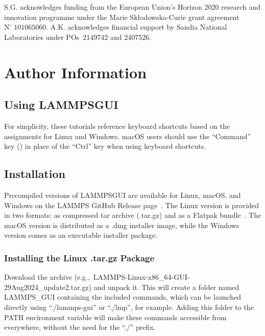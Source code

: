 \documentclass[9pt,tutorial]{livecoms}
\newcommand{\lammpsgui}{\textsf{LAMMPS\textendash GUI}}
\begin{document}
S.G. acknowledges funding from the European Union's Horizon 2020 research and
innovation programme under the Marie Skłodowska-Curie grant agreement $\text{N}^\circ\;101065060$.
A.K. acknowledges financial support by Sandia National Laboratories under
POs~2149742 and 2407526.

\section*{Author Information}
\makeorcid




\begin{appendices}
\section{Using \lammpsgui{}}
\label{using-lammps-gui-label}

\begin{note}
For simplicity, these tutorials reference keyboard shortcuts
based on the assignments for Linux and Windows.  {macOS} users should
use the ``Command'' key (\cmd) in place of the
``Ctrl'' key when using keyboard shortcuts.
\end{note}

\subsection{Installation}

Precompiled versions of \lammpsgui{} are available for Linux, {macOS},
and Windows on the LAMMPS GitHub Release
page~\cite{lammps_github_release}.  The Linux version is provided in two
formats: as compressed tar archive (.tar.gz) and as a Flatpak
bundle~\cite{flatpak_home}.  The {macOS} version is distributed as a
.dmg installer image, while the Windows version comes as an executable
installer package.

\subsubsection{Installing the Linux .tar.gz Package}

Download the archive (e.g.,~LAMMPS-Linux-x86\_64-GUI-29Aug2024\_update2.tar.gz)
and unpack it.  This will create a folder named LAMMPS\_GUI containing the
included commands, which can be launched directly using ``./lammps-gui'' or
``./lmp'', for example.  Adding this folder to the PATH environment
variable will make these commands accessible from everywhere, without the
need for the ``./'' prefix.


\end{appendices}
\end{document}
